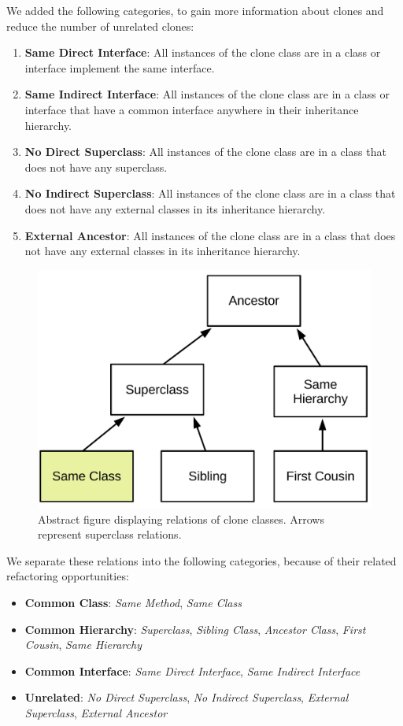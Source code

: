 \documentclass[runningheads]{llncs}
\begin{document}
We added the following categories, to gain more information about clones and reduce the number of unrelated clones:

\begin{enumerate}
\item \textbf{Same Direct Interface}: All instances of the clone class are in a class or interface implement the same interface.
\item \textbf{Same Indirect Interface}: All instances of the clone class are in a class or interface that have a common interface anywhere in their inheritance hierarchy.
\item \textbf{No Direct Superclass}: All instances of the clone class are in a class that does not have any superclass.
\item \textbf{No Indirect Superclass}: All instances of the clone class are in a class that does not have any external classes in its inheritance hierarchy.
\item \textbf{External Ancestor}: All instances of the clone class are in a class that does not have any external classes in its inheritance hierarchy.
\end{enumerate}

\begin{figure}[H]
  \centering
    \includegraphics[width=0.7\columnwidth]{img/Relation}
      \caption{Abstract figure displaying relations of clone classes. Arrows represent superclass relations.}
  \label{fig:clonerelation}
\end{figure}

We separate these relations into the following categories, because of their related refactoring opportunities:
\begin{itemize}
  \item \textbf{Common Class}: \textit{Same Method}, \textit{Same Class}
  \item \textbf{Common Hierarchy}: \textit{Superclass}, \textit{Sibling Class}, \textit{Ancestor Class}, \textit{First Cousin}, \textit{Same Hierarchy}
  \item \textbf{Common Interface}: \textit{Same Direct Interface}, \textit{Same Indirect Interface}
  \item \textbf{Unrelated}: \textit{No Direct Superclass}, \textit{No Indirect Superclass}, \textit{External Superclass}, \textit{External Ancestor}
\end{itemize}
\end{document}

